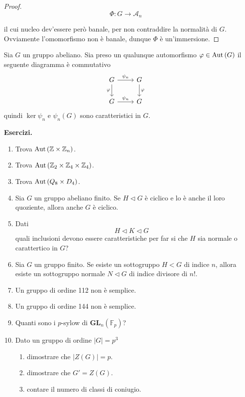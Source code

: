 \begin{multicols}{2}
\begin{proof}
		\[ \Phi \colon G \to \mathcal{A}_n \]
		
		il cui nucleo dev'essere però banale, per non contraddire la normalità di $ G $. Ovviamente l'omomorfismo non è banale, dunque $ \Phi $ è un'immersione.
	\end{proof}
	
	
	\begin{remark}
		Sia $ G $ un gruppo abeliano. Sia  preso un qualunque automorfismo $ \varphi \in \mathrm{Aut}\left( G \right) $ il seguente diagramma è commutativo
		\[ \begin{tikzcd}
		G \arrow{r}{\psi _n} \arrow[swap]{d}{\varphi} & G \arrow{d}{\varphi} \\
		G \arrow{r}{\psi _n} & G
		\end{tikzcd}
		\]
		quindi $ \ker\psi _n $ e $ \psi _n(G) $ sono caratteristici in $ G $. \\
		
	\end{remark}
	
	\textbf{Esercizi.}
	\begin{enumerate}
		\item Trova $ \mathrm{Aut}\left( \mathbb{Z}\times\mathbb{Z}_n \right) $.
		\item Trova $ \mathrm{Aut}\left( \mathbb{Z}_2\times\mathbb{Z}_4\times\mathbb{Z}_4 \right) $.
		\item Trova $ \mathrm{Aut}\left( Q_8 \times D_4 \right) $.
		\item Sia $ G $ un gruppo abeliano finito. Se $ H \lhd G $ è ciclico e lo è anche il loro quoziente, allora anche $ G $ è ciclico.
		\item Dati $$  H \lhd K \lhd G  $$ quali inclusioni devono essere caratteristiche per far si che $ H $ sia normale o carattertico in $ G $?
		
		\item Sia $ G $ un gruppo finito. Se esiste un sottogruppo $ H < G $ di indice $ n $, allora esiste un sottogruppo normale $ N \lhd G $ di indice divisore di $ n! $.
		
		\item Un gruppo di ordine 112 non è semplice.
		
		\item Un gruppo di ordine 144 non è semplice.
		
		\item Quanti sono i $ p $-sylow di $ \textbf{GL}_n(\mathbb{F}_p) $?
		
		\item Dato un gruppo di ordine $ |G|= p^3 $
		\begin{enumerate}
			\item dimostrare che $ |Z(G)| = p $.
			\item dimostrare che $ G' = Z(G) $.
			\item contare il numero di classi di coniugio.
		\end{enumerate}
		

\end{enumerate}
\end{multicols}
